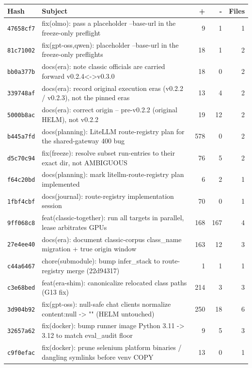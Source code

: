 \begin{longtable}{@{}p{}p{}r r r@{}}
\toprule Hash & Subject & + & - & Files \\ \midrule\endhead
\texttt{47658cf7} & fix(olmo): pass a placeholder --base-url in the freeze-only preflight & 9 & 1 & 1 \\
\texttt{81c71002} & fix(gpt-oss,qwen): placeholder --base-url in the freeze-only preflights & 18 & 1 & 2 \\
\texttt{bb0a377b} & docs(era): note classic officials are carried forward v0.2.4<->v0.3.0 & 18 & 0 & 2 \\
\texttt{339748af} & docs(era): record original execution eras (v0.2.2 / v0.2.3), not the pinned eras & 13 & 4 & 2 \\
\texttt{5000b8ac} & docs(era): correct origin -- pre-v0.2.2 (original HELM), not v0.2.2 & 19 & 12 & 2 \\
\texttt{b445a7fd} & docs(planning): LiteLLM route-registry plan for the shared-gateway 400 bug & 578 & 0 & 2 \\
\texttt{d5c70c94} & fix(freeze): resolve subset run-entries to their exact dir, not AMBIGUOUS & 76 & 5 & 2 \\
\texttt{f64c20bd} & docs(planning): mark litellm-route-registry plan implemented & 6 & 2 & 1 \\
\texttt{1fbf4cbf} & docs(journal): route-registry implementation session & 70 & 0 & 1 \\
\texttt{9ff068c8} & feat(classic-together): run all targets in parallel, lease arbitrates GPUs & 168 & 167 & 4 \\
\texttt{27e4ee40} & docs(era): document classic-corpus class\_name migration + true origin window & 163 & 12 & 3 \\
\texttt{c44a6467} & chore(submodule): bump infer\_stack to route-registry merge (22d94317) & 1 & 1 & 1 \\
\texttt{c3e68bed} & feat(era-shim): canonicalize relocated class paths (G13 fix) & 214 & 3 & 3 \\
\texttt{3d904b92} & fix(gpt-oss): null-safe chat clients normalize content:null -> "" (HELM untouched) & 250 & 18 & 6 \\
\texttt{32657a62} & fix(docker): bump runner image Python 3.11 -> 3.12 to match eval\_audit floor & 9 & 5 & 3 \\
\texttt{c9f0efac} & fix(docker): prune selenium platform binaries / dangling symlinks before venv COPY & 13 & 0 & 1 \\
\bottomrule\end{longtable}
